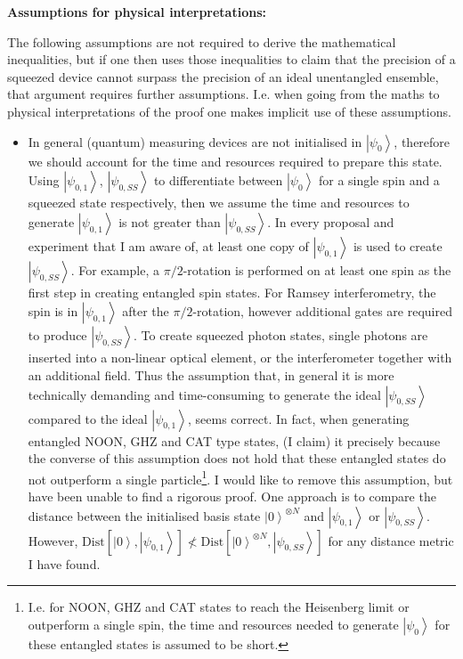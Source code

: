 \documentclass[reqno]{amsart}
\newcommand{\ket}[1]{\left| #1 \right>}
\def\func#1#2{\mathrm{#1}\left[#2\right]}
\begin{document}
\noindent\textbf{Assumptions for physical interpretations:}

The following assumptions are not required to derive the mathematical inequalities, but if one then uses those inequalities to claim that the precision of a squeezed device cannot surpass the precision of an ideal unentangled ensemble, that argument requires further assumptions. I.e. when going from the maths to physical interpretations of the proof one makes implicit use of these assumptions. 
\begin{itemize}
\item In general (quantum) measuring devices are not initialised in $\ket{\psi_0}$, therefore we should account for the time and resources required to prepare this state. Using $\ket{\psi_{0,1}}$, $\ket{\psi_{0,SS}}$ to differentiate between $\ket{\psi_0}$ for a single spin and a squeezed state respectively, then we assume the time and resources to generate $\ket{\psi_{0,1}}$ is not greater than $\ket{\psi_{0,SS}}$. In every proposal and experiment that I am aware of, at least one copy of $\ket{\psi_{0,1}}$ is used to create $\ket{\psi_{0,SS}}$. For example, a $\pi/2$-rotation is performed on at least one spin as the first step in creating entangled spin states. For Ramsey interferometry, the spin is in $\ket{\psi_{0,1}}$ after the $\pi/2$-rotation, however additional gates are required to produce $\ket{\psi_{0,SS}}$. To create squeezed photon states, single photons are inserted into a non-linear optical element, or the interferometer together with an additional field. Thus the assumption that, in general it is more technically demanding and time-consuming to generate the ideal $\ket{\psi_{0,SS}}$ compared to the ideal $\ket{\psi_{0,1}}$, seems correct. In fact, when generating entangled NOON, GHZ and CAT type states, (I claim) it precisely because the converse of this assumption does not hold that these entangled states do not outperform a single particle\footnote{I.e. for NOON, GHZ and CAT states to reach the Heisenberg limit or outperform a single spin, the time and resources needed to generate $\ket{\psi_0}$ for these entangled states is assumed to be short.}. I would like to remove this assumption, but have been unable to find a rigorous proof. One approach is to compare the distance between the initialised basis state $\ket{0}^{\otimes N}$ and $\ket{\psi_{0,1}}$ or $\ket{\psi_{0,SS}}$. However, $\func{Dist}{\ket{0},\ket{\psi_{0,1}}} \nless \func{Dist}{\ket{0}^{\otimes N},\ket{\psi_{0,SS}}}$ for any distance metric I have found.

\end{itemize}
\end{document}
